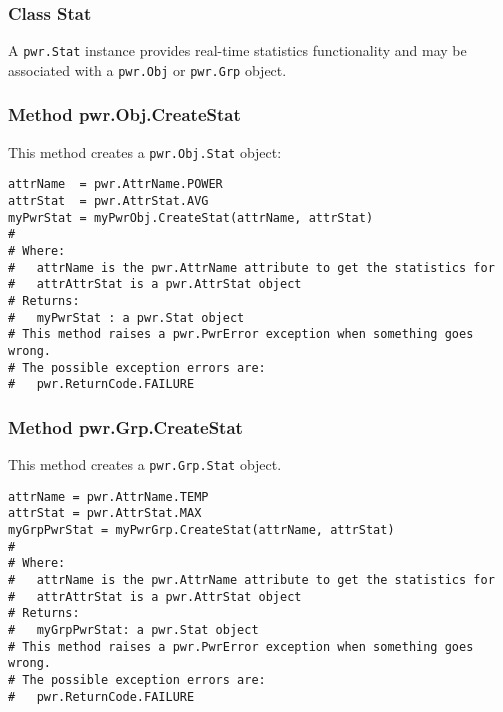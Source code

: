 \documentclass[12pt]{report} %
\begin{document}
\begin{appendices}
\subsubsection{Class Stat} \label{class:CreateStat}

A \texttt{pwr.Stat} instance provides real-time statistics functionality and may be associated with a \texttt{pwr.Obj} or \texttt{pwr.Grp} object.

\subsubsection{Method pwr.Obj.CreateStat } \label{meth:ObjCreateStat}

This method creates a \texttt{pwr.Obj.Stat} object:

\begin{center}\begin{minipage}{.95\linewidth}\begin{lstlisting}
attrName  = pwr.AttrName.POWER
attrStat  = pwr.AttrStat.AVG
myPwrStat = myPwrObj.CreateStat(attrName, attrStat)
#
# Where:
#   attrName is the pwr.AttrName attribute to get the statistics for
#   attrAttrStat is a pwr.AttrStat object
# Returns:
#   myPwrStat : a pwr.Stat object
# This method raises a pwr.PwrError exception when something goes wrong.
# The possible exception errors are:
#   pwr.ReturnCode.FAILURE
\end{lstlisting}\end{minipage}\end{center}

\subsubsection{Method pwr.Grp.CreateStat } \label{meth:GrpCreateStat}

This method creates a \texttt{pwr.Grp.Stat} object.

\begin{center}\begin{minipage}{.95\linewidth}\begin{lstlisting}
attrName = pwr.AttrName.TEMP
attrStat = pwr.AttrStat.MAX
myGrpPwrStat = myPwrGrp.CreateStat(attrName, attrStat)
#
# Where:
#   attrName is the pwr.AttrName attribute to get the statistics for
#   attrAttrStat is a pwr.AttrStat object
# Returns:
#   myGrpPwrStat: a pwr.Stat object
# This method raises a pwr.PwrError exception when something goes wrong.
# The possible exception errors are:
#   pwr.ReturnCode.FAILURE
\end{lstlisting}\end{minipage}\end{center}


\end{appendices}
\end{document}

